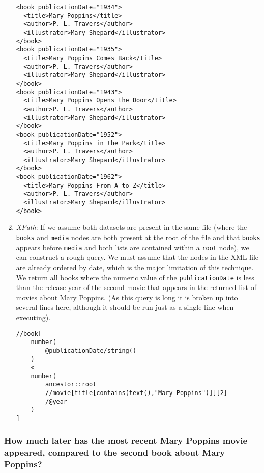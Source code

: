 \documentclass[11pt]{article}
\begin{document}
\begin{enumerate}
\begin{verbatim}
<book publicationDate="1934">
  <title>Mary Poppins</title>
  <author>P. L. Travers</author>
  <illustrator>Mary Shepard</illustrator>
</book>
<book publicationDate="1935">
  <title>Mary Poppins Comes Back</title>
  <author>P. L. Travers</author>
  <illustrator>Mary Shepard</illustrator>
</book>
<book publicationDate="1943">
  <title>Mary Poppins Opens the Door</title>
  <author>P. L. Travers</author>
  <illustrator>Mary Shepard</illustrator>
</book>
<book publicationDate="1952">
  <title>Mary Poppins in the Park</title>
  <author>P. L. Travers</author>
  <illustrator>Mary Shepard</illustrator>
</book>
<book publicationDate="1962">
  <title>Mary Poppins From A to Z</title>
  <author>P. L. Travers</author>
  <illustrator>Mary Shepard</illustrator>
</book>
\end{verbatim} 

\item \textit{XPath}: If we assume both datasets are present in the same file (where the \texttt{books} and \texttt{media} nodes are both present at the root of the file and that \texttt{books} appears before \texttt{media} and both lists are contained within a \texttt{root} node), we can construct a rough query. We must assume that the nodes in the XML file are already ordered by date, which is the major limitation of this technique. We return all books where the numeric value of the \texttt{publicationDate} is less than the release year of the second movie that appears in the returned list of movies about Mary Poppins. (As this query is long it is broken up into several lines here, although it should be run just as a single line when executing).
\begin{small}
\begin{verbatim}
//book[
    number(
        @publicationDate/string()
    )
    <
    number(
        ancestor::root
        //movie[title[contains(text(),"Mary Poppins")]][2]
        /@year
    )
]
\end{verbatim}
\end{small}
\end{enumerate}

\subsubsection{How much later has the most recent Mary Poppins movie appeared, compared to the second book about Mary Poppins?}
\end{document}
